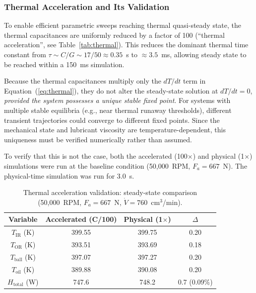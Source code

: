 \documentclass[applsci,article,submit,pdftex,moreauthors]{Definitions/mdpi}
\begin{document}
\subsubsection{Thermal Acceleration and Its Validation}
\label{sec:thermal_accel}

To enable efficient parametric sweeps reaching thermal quasi-steady state, the thermal capacitances are uniformly reduced by a factor of 100 (``thermal acceleration'', see Table~\ref{tab:thermal}). This reduces the dominant thermal time constant from $\tau \sim C/G \sim 17/50 \approx 0.35$~s to $\approx 3.5$~ms, allowing steady state to be reached within a 150~ms simulation.

Because the thermal capacitances multiply only the $dT/dt$ term in Equation~(\ref{eq:thermal}), they do not alter the steady-state solution at $dT/dt = 0$, \emph{provided the system possesses a unique stable fixed point}. For systems with multiple stable equilibria (e.g., near thermal runaway thresholds), different transient trajectories could converge to different fixed points. Since the mechanical state and lubricant viscosity are temperature-dependent, this uniqueness must be verified numerically rather than assumed.

To verify that this is not the case, both the accelerated (100$\times$) and physical (1$\times$) simulations were run at the baseline condition (50,000~RPM, $F_a = 667$~N). The physical-time simulation was run for 3.0~s.

\begin{table}[H]
    \caption{Thermal acceleration validation: steady-state comparison (50,000~RPM, $F_a = 667$~N,  $\dot{V} = 760$~cm$^3$/min).\label{tab:accel_valid}}
    \begin{tabularx}{\textwidth}{CCCC}
        \toprule
        \textbf{Variable} & \textbf{Accelerated (C/100)} & \textbf{Physical (1$\times$)} & \textbf{$\Delta$} \\
        \midrule
        $T_{\text{IR}}$ (K) & 399.55 & 399.75 & 0.20 \\
        $T_{\text{OR}}$ (K) & 393.51 & 393.69 & 0.18 \\
        $T_{\text{ball}}$ (K) & 397.07 & 397.27 & 0.20 \\
        $T_{\text{oil}}$ (K) & 389.88 & 390.08 & 0.20 \\
        $H_{\text{total}}$ (W) & 747.6 & 748.2 & 0.7 (0.09\%) \\
        \bottomrule
    \end{tabularx}
\end{table}
\end{document}
